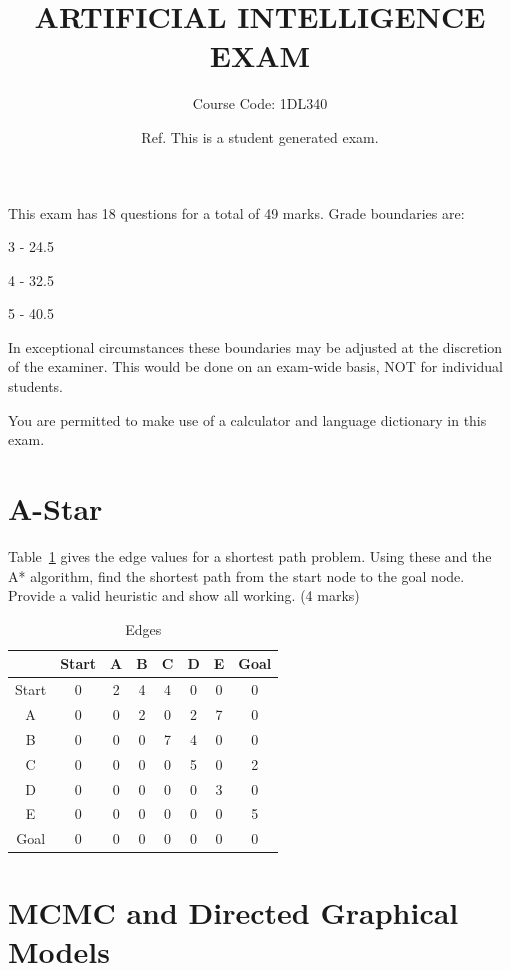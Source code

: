 \documentclass{article}
\begin{document}
 \title{ARTIFICIAL INTELLIGENCE EXAM}
 \author{Course Code: 1DL340}
 \date{Ref.  This is a student generated exam. }
 \maketitle

 This exam has  18  questions for a total of  49  marks. Grade boundaries are:

 \begin{center}
 3 -  24.5 

 4 -  32.5 

 5 -  40.5 

 \end{center}

 In exceptional circumstances these boundaries may be adjusted at the discretion of the examiner. This would be done on an exam-wide basis, NOT for individual students.

 You are permitted to make use of a calculator and language dictionary in this exam.
\clearpage
\section{A-Star}

Table~\ref{AStar_Edges} gives the edge values for a shortest path problem. Using these and the A* algorithm, find the shortest path from the start node to the goal node. Provide a valid heuristic and show all working. (4 marks)

\begin{table}[h!]
\caption{Edges}
\label{AStar_Edges}
\begin{center}
\begin{tabular}{ |c||c|c|c|c|c|c|c| } 
\hline
 & Start & A & B & C & D & E & Goal\\
\hline
Start & 0 & 2 & 4 & 4 & 0 & 0 & 0\\
A & 0 & 0 & 2 & 0 & 2 & 7 & 0\\
B & 0 & 0 & 0 & 7 & 4 & 0 & 0\\
C & 0 & 0 & 0 & 0 & 5 & 0 & 2\\
D & 0 & 0 & 0 & 0 & 0 & 3 & 0\\
E & 0 & 0 & 0 & 0 & 0 & 0 & 5\\
Goal & 0 & 0 & 0 & 0 & 0 & 0 & 0\\
\hline
\end{tabular}
\end{center}
\end{table}
\clearpage
\section{MCMC and Directed Graphical Models}
\end{document}
